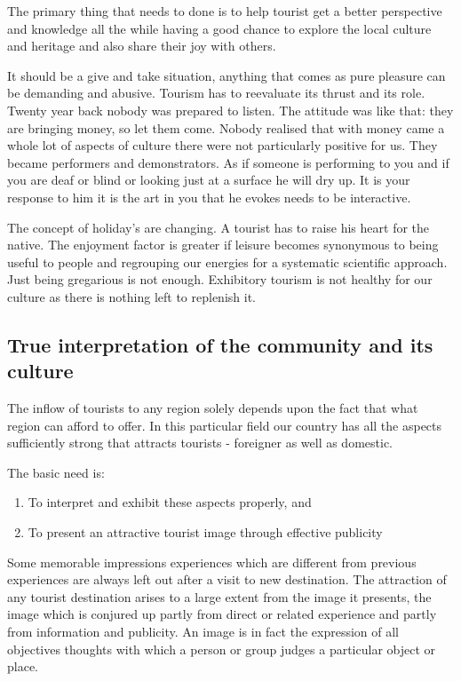 The primary thing that needs to done is to help tourist get a better perspective and knowledge all the while having a good chance to explore the local culture and heritage and also share their joy with others.

It should be a give and take situation, anything that comes as pure pleasure can be demanding and abusive. Tourism has to reevaluate its thrust and its role. Twenty year back nobody was prepared to listen. The attitude was like that: they are bringing money, so let them come. Nobody realised that with money came a whole lot of aspects of culture there were not particularly positive for us. They became performers and demonstrators. As if someone is performing to you and if you are deaf or blind or looking just at a surface he will dry up. It is your response to him it is the art in you that he evokes needs to be interactive.

The concept of holiday's are changing. A tourist has to raise his heart for the native. The enjoyment factor is greater if leisure becomes synonymous to being useful to people and regrouping our energies for a systematic scientific approach. Just being gregarious is not enough. Exhibitory tourism is not healthy for our culture as there is nothing left to replenish it.


\subsection{True interpretation of the community and its culture} %
\label{sub:tic}

The inflow of tourists to any region solely depends upon the fact that what region can afford to offer. In this particular field our country has all the aspects sufficiently strong that attracts tourists - foreigner as well as domestic.

The basic need is:

\begin{enumerate}
  \item To interpret and exhibit these aspects properly, and
  \item To present an attractive tourist image through effective publicity
\end{enumerate}

Some memorable impressions experiences which are different from previous experiences are always left out after a visit to new destination. The attraction of any tourist destination arises to a large extent from the image it presents, the image which is conjured up partly from direct or related experience and partly from information and publicity. An image is in fact the expression of all objectives thoughts with which a person or group judges a particular object or place.

